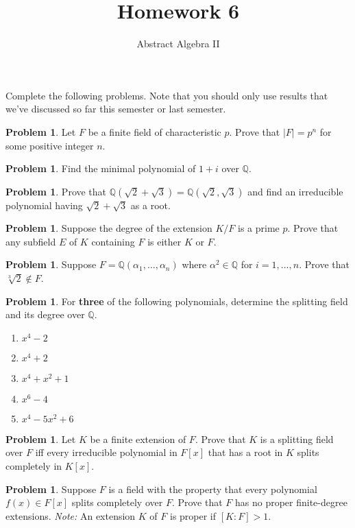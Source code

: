 \documentclass[11pt]{scrartcl}
\theoremstyle{definition}
\newtheorem{problem}[theorem]{Problem}
\begin{document}
\title{Homework 6}
\subtitle{Abstract Algebra II}
\date{}

\maketitle
\thispagestyle{fancy}

Complete the following problems. Note that you should only use results that we've discussed so far this semester or last semester.

\begin{problem}
Let $F$ be a finite field of characteristic $p$.  Prove that $|F|=p^n$ for some positive integer $n$.
\end{problem}

\begin{problem}
Find the minimal polynomial of $1+i$ over $\mathbb{Q}$.
\end{problem}

\begin{problem}
Prove that $\mathbb{Q}(\sqrt{2}+\sqrt{3})=\mathbb{Q}(\sqrt{2},\sqrt{3})$ and find an irreducible polynomial having $\sqrt{2}+\sqrt{3}$ as a root.
\end{problem}

\begin{problem}
Suppose the degree of the extension $K/F$ is a prime $p$.  Prove that any subfield $E$ of $K$ containing $F$ is either $K$ or $F$.
\end{problem}

\begin{problem}
Suppose $F=\mathbb{Q}(\alpha_1,\ldots,\alpha_n)$ where $\alpha^2\in\mathbb{Q}$ for $i=1,\ldots,n$. Prove that $\sqrt[3]{2}\notin F$.
\end{problem}

\begin{problem}
For \textbf{three} of the following polynomials, determine the splitting field and its degree over $\mathbb{Q}$.
\begin{enumerate}[label=\rm{(\alph*)}]
\item $x^4-2$
\item $x^4+2$
\item $x^4+x^2+1$
\item $x^6-4$
\item $x^4-5x^2+6$
\end{enumerate}
\end{problem}

\begin{problem}
Let $K$ be a finite extension of $F$.  Prove that $K$ is a splitting field over $F$ iff every irreducible polynomial in $F[x]$ that has a root in $K$ splits completely in $K[x]$.
\end{problem}

\begin{problem}
Suppose $F$ is a field with the property that every polynomial $f(x)\in F[x]$ splits completely over $F$.  Prove that $F$ has no proper finite-degree extensions. \emph{Note:} An extension $K$ of $F$ is proper if $[K:F]>1$.
\end{problem}
\end{document}
